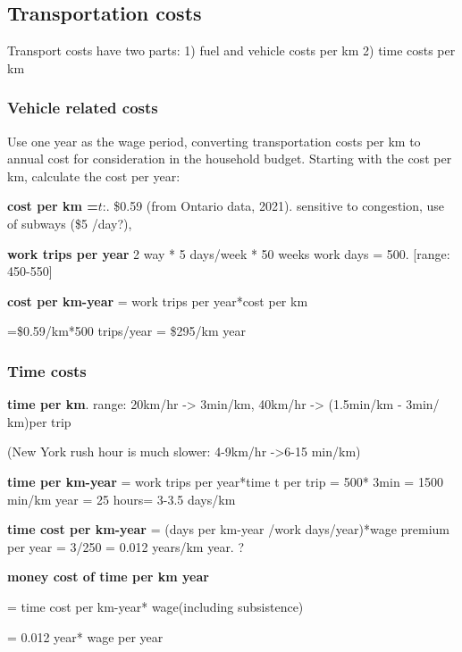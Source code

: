 \subsection{Transportation costs}
Transport costs have two parts:
1) fuel and vehicle costs per km
2) time costs per km

\subsubsection{Vehicle related costs}
Use one year as the wage period, converting transportation costs per km to annual cost for consideration in the household budget. Starting with the cost per km, calculate the cost per year:

\textbf{cost per km =$\textit{t}$}:. \$0.59   (from  Ontario data, 2021). sensitive to congestion, use of subways (\$5 /day?), 

 \textbf{work trips per year} 2 way * 5 days/week * 50 weeks work days = 500. [range: 450-550]

\textbf{cost per km-year} = work trips per year*cost per km

=\$0.59/km*500 trips/year  =  \$295/km year 

\subsubsection{Time costs}
\textbf{time per km}. range: 20km/hr -> 3min/km, 40km/hr -> (1.5min/km - 3min/ km)per trip 

(New York rush hour is much slower:  4-9km/hr ->6-15 min/km)

\textbf{time  per km-year} = work trips per year*time t per trip = 500* 3min  = 1500 min/km year = 25 hours= 3-3.5 days/km
 
\textbf{time cost per km-year} =  (days per km-year /work days/year)*wage premium per year  = 3/250 = 0.012 years/km year. ?

\textbf{money cost of time per km year} 

= time cost per km-year* wage(including subsistence) 

= 0.012 year* wage per year

